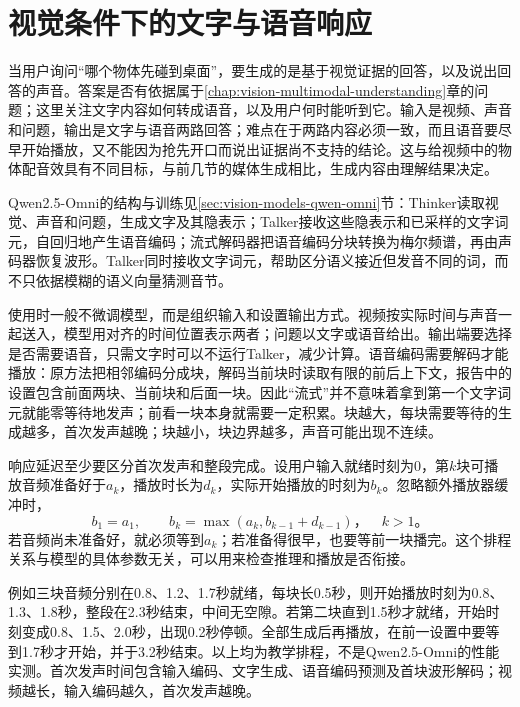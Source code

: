\section{视觉条件下的文字与语音响应}
\label{sec:vision-multigen-response}
\label{sec:vision-multigen-omni-response}

当用户询问“哪个物体先碰到桌面”，要生成的是基于视觉证据的回答，以及说出回答的声音。答案是否有依据属于\ref{chap:vision-multimodal-understanding}章的问题；这里关注文字内容如何转成语音，以及用户何时能听到它。输入是视频、声音和问题，输出是文字与语音两路回答；难点在于两路内容必须一致，而且语音要尽早开始播放，又不能因为抢先开口而说出证据尚不支持的结论。这与给视频中的物体配音效具有不同目标，与前几节的媒体生成相比，生成内容由理解结果决定。

Qwen2.5-Omni的结构与训练见\ref{sec:vision-models-qwen-omni}节：Thinker读取视觉、声音和问题，生成文字及其隐表示；Talker接收这些隐表示和已采样的文字词元，自回归地产生语音编码；流式解码器把语音编码分块转换为梅尔频谱，再由声码器恢复波形。Talker同时接收文字词元，帮助区分语义接近但发音不同的词，而不只依据模糊的语义向量猜测音节。

使用时一般不微调模型，而是组织输入和设置输出方式。视频按实际时间与声音一起送入，模型用对齐的时间位置表示两者；问题以文字或语音给出。输出端要选择是否需要语音，只需文字时可以不运行Talker，减少计算。语音编码需要解码才能播放：原方法把相邻编码分成块，解码当前块时读取有限的前后上下文，报告中的设置包含前面两块、当前块和后面一块。因此“流式”并不意味着拿到第一个文字词元就能零等待地发声；前看一块本身就需要一定积累。块越大，每块需要等待的生成越多，首次发声越晚；块越小，块边界越多，声音可能出现不连续。

响应延迟至少要区分首次发声和整段完成。设用户输入就绪时刻为0，第$k$块可播放音频准备好于$a_k$，播放时长为$d_k$，实际开始播放的时刻为$b_k$。忽略额外播放器缓冲时，
\begin{equation}
  b_1=a_1,\qquad
  b_k=\max(a_k,b_{k-1}+d_{k-1})\text{，}\quad k>1\text{。}
  \label{eq:vision-stream-playback}
\end{equation}
若音频尚未准备好，就必须等到$a_k$；若准备得很早，也要等前一块播完。这个排程关系与模型的具体参数无关，可以用来检查推理和播放是否衔接。

例如三块音频分别在0.8、1.2、1.7秒就绪，每块长0.5秒，则开始播放时刻为0.8、1.3、1.8秒，整段在2.3秒结束，中间无空隙。若第二块直到1.5秒才就绪，开始时刻变成0.8、1.5、2.0秒，出现0.2秒停顿。全部生成后再播放，在前一设置中要等到1.7秒才开始，并于3.2秒结束。以上均为教学排程，不是Qwen2.5-Omni的性能实测。首次发声时间包含输入编码、文字生成、语音编码预测及首块波形解码；视频越长，输入编码越久，首次发声越晚。

